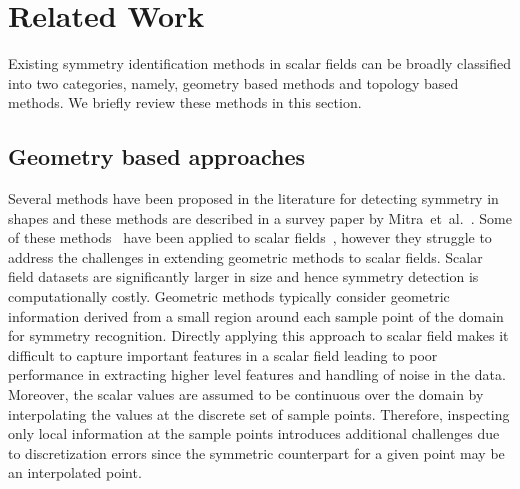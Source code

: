 \documentclass[review,journal]{vgtc}         %
\begin{document}
\section{Related Work}
Existing symmetry identification methods in scalar fields can be broadly classified into two
categories, namely, geometry based methods and topology based methods. We briefly review
these methods in this section.
\subsection{Geometry based approaches}
Several methods have been proposed in the literature for detecting
symmetry in shapes and these methods are described in a survey paper by
Mitra~et~al.~\cite{MitPWC2012}. Some of these methods~\cite{Mitra06,KazhdanCDFR03,BokBWSS09} have 
been applied to scalar fields~\cite{MasoodTN13,HongS08,kerbWKS11}, however they struggle to address 
the challenges in extending geometric methods to scalar fields.
Scalar field datasets are significantly larger in size and hence symmetry detection is computationally costly.
Geometric methods typically consider geometric information derived from a small region around each sample
point of the domain for symmetry recognition. Directly applying this approach to scalar field makes it difficult 
to capture important features in a scalar field leading to poor performance in extracting higher level
features and handling of noise in the data.
Moreover, the scalar values are assumed to be continuous over the domain by interpolating the values at 
the discrete set of sample points. Therefore, inspecting only local information at the sample points
introduces additional challenges due to discretization errors since the symmetric counterpart for a 
given point may be an interpolated point.
\end{document}
